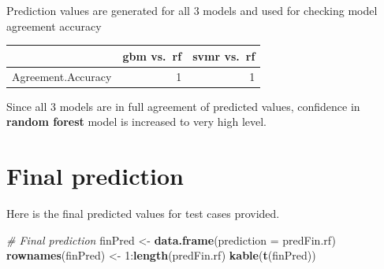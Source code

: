 \documentclass[]{article}
\newenvironment{Shaded}{\begin{snugshade}}{\end{snugshade}}
\newcommand{\KeywordTok}[1]{\textcolor[rgb]{0.13,0.29,0.53}{\textbf{{#1}}}}
\newcommand{\DataTypeTok}[1]{\textcolor[rgb]{0.13,0.29,0.53}{{#1}}}
\newcommand{\DecValTok}[1]{\textcolor[rgb]{0.00,0.00,0.81}{{#1}}}
\newcommand{\StringTok}[1]{\textcolor[rgb]{0.31,0.60,0.02}{{#1}}}
\newcommand{\CommentTok}[1]{\textcolor[rgb]{0.56,0.35,0.01}{\textit{{#1}}}}
\newcommand{\NormalTok}[1]{{#1}}
\begin{document}
Prediction values are generated for all 3 models and used for checking
model agreement accuracy

\begin{Shaded}
\end{Shaded}

\begin{longtable}[]{@{}lrr@{}}
\toprule
& gbm vs.~rf & svmr vs.~rf\tabularnewline
\midrule
\endhead
Agreement.Accuracy & 1 & 1\tabularnewline
\bottomrule
\end{longtable}

Since all 3 models are in full agreement of predicted values, confidence
in \textbf{random forest} model is increased to very high level.

\section{Final prediction}\label{final-prediction}

Here is the final predicted values for test cases provided.

\begin{Shaded}
\begin{Highlighting}[]
\CommentTok{# Final prediction}
\NormalTok{finPred <-}\StringTok{ }\KeywordTok{data.frame}\NormalTok{(}\DataTypeTok{prediction =} \NormalTok{predFin.rf)}
\KeywordTok{rownames}\NormalTok{(finPred) <-}\StringTok{ }\DecValTok{1}\NormalTok{:}\KeywordTok{length}\NormalTok{(predFin.rf)}
\KeywordTok{kable}\NormalTok{(}\KeywordTok{t}\NormalTok{(finPred))}
\end{Highlighting}
\end{Shaded}
\end{document}
